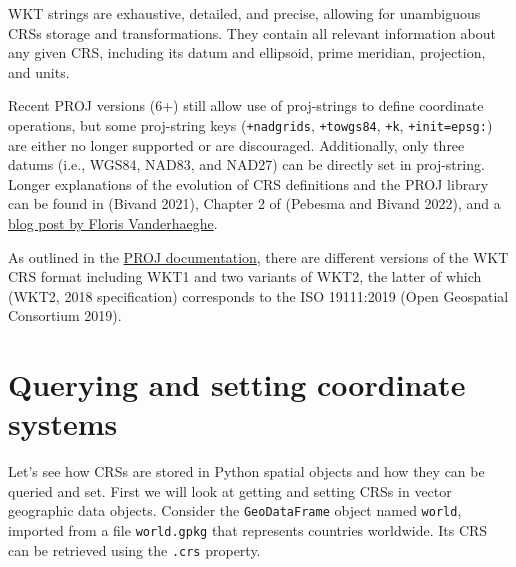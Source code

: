 \documentclass[
  letterpaper,
]{krantz}
\begin{document}
WKT strings are exhaustive, detailed, and precise, allowing for
unambiguous CRSs storage and transformations. They contain all relevant
information about any given CRS, including its datum and ellipsoid,
prime meridian, projection, and units.

Recent PROJ versions (6+) still allow use of proj-strings to define
coordinate operations, but some proj-string keys (\texttt{+nadgrids},
\texttt{+towgs84}, \texttt{+k}, \texttt{+init=epsg:}) are either no
longer supported or are discouraged. Additionally, only three datums
(i.e., WGS84, NAD83, and NAD27) can be directly set in proj-string.
Longer explanations of the evolution of CRS definitions and the PROJ
library can be found in (Bivand 2021), Chapter 2 of (Pebesma and Bivand
2022), and a
\href{https://inbo.github.io/tutorials/tutorials/spatial_crs_coding/}{blog
post by Floris Vanderhaeghe}.

\begin{tcolorbox}[enhanced jigsaw, title=\textcolor{quarto-callout-note-color}{\faInfo}\hspace{0.5em}{Note}, arc=.35mm, toprule=.15mm, titlerule=0mm, colframe=quarto-callout-note-color-frame, breakable, toptitle=1mm, bottomtitle=1mm, rightrule=.15mm, colbacktitle=quarto-callout-note-color!10!white, leftrule=.75mm, left=2mm, bottomrule=.15mm, opacityback=0, coltitle=black, opacitybacktitle=0.6, colback=white]

As outlined in the
\href{https://proj.org/development/reference/cpp/cpp_general.html}{PROJ
documentation}, there are different versions of the WKT CRS format
including WKT1 and two variants of WKT2, the latter of which (WKT2, 2018
specification) corresponds to the ISO 19111:2019 (Open Geospatial
Consortium 2019).

\end{tcolorbox}

\section{Querying and setting coordinate
systems}\label{sec-querying-and-setting-coordinate-systems}

Let's see how CRSs are stored in Python spatial objects and how they can
be queried and set. First we will look at getting and setting CRSs in
vector geographic data objects. Consider the \texttt{GeoDataFrame}
object named \texttt{world}, imported from a file \texttt{world.gpkg}
that represents countries worldwide. Its CRS can be retrieved using the
\texttt{.crs} property.
\end{document}
